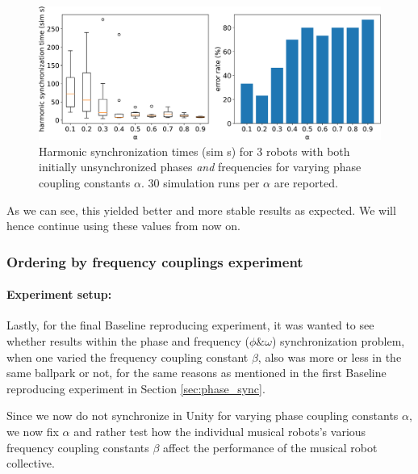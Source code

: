 			\begin{figure}[ht!]
				\centering
				\includegraphics[width=\linewidth]{Assets/DocSegments/Chapters/ExperimentsAndResults/Figures/PerfScores/stable_baseline_reproducing_phase_and_freq_sync_for_alpha.pdf}
				\caption[Experiment results for $\phi$ \& $\omega$ synchronization baseline reproduction and stabilization experiment.]{Harmonic synchronization times (sim s) for 3 robots with both initially unsynchronized phases \textit{and} frequencies for varying phase coupling constants $\alpha$. 30 simulation runs per $\alpha$ are reported.}
				\label{fig:stable_baseline_reproducing_phase_and_freq_sync_for_alpha}
			\end{figure}
			
			As we can see, this yielded better and more stable results as expected. We will hence continue using these values from now on.
			
			
	
		\subsubsection{Ordering by frequency couplings experiment}
		
		\paragraph{Experiment setup:\nl}
		
		Lastly, for the final Baseline reproducing experiment, it was wanted to see whether results within the phase and frequency ($\phi\&\omega$) synchronization problem, when one varied the frequency coupling constant $\beta$, also was more or less in the same ballpark or not, for the same reasons as mentioned in the first Baseline reproducing experiment in Section \ref{sec:phase_sync}.
		
		Since we now do not synchronize in Unity for varying phase coupling constants $\alpha$, we now fix $\alpha$ and rather test how the individual musical robots's various frequency coupling constants $\beta$ affect the performance of the musical robot collective.
		
